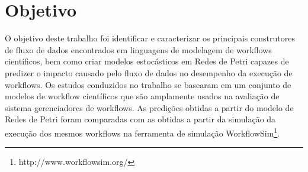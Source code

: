 \section{Objetivo}

		O objetivo deste trabalho foi identificar e caracterizar os principais construtores de fluxo de dados encontrados em linguagens de modelagem de workflows científicos, bem como criar modelos estocásticos em Redes de Petri capazes de predizer o impacto causado pelo fluxo de dados no desempenho da execução de workflows. Os estudos conduzidos no trabalho se basearam em um conjunto de modelos de workflow científicos que são amplamente usados na avaliação de sistema gerenciadores de workflows. As predições obtidas a partir do modelo de Redes de Petri foram comparadas com as obtidas a partir da simulação da execução dos mesmos workflows na ferramenta de simulação WorkflowSim\footnote{http://www.workflowsim.org/}.
